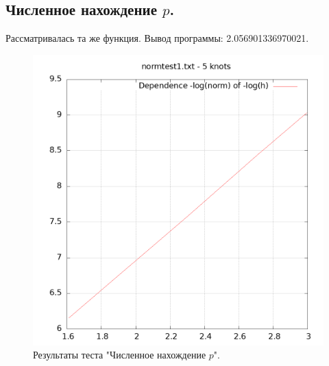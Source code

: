 \documentclass[14pt,a4paper]{extarticle}
\newcommand{\1}{\mathbbm{1}}
\begin{document}
    \subsection{Численное нахождение $p$.}

    Рассматривалась та же функция. Вывод программы: 2.056901336970021.

    \begin{figure}
        \centering
        \includegraphics[scale=0.5]{Images/normtest1.txt.png}
        \caption{Результаты теста "Численное нахождение $p$".}
    \end{figure}
\end{document}
